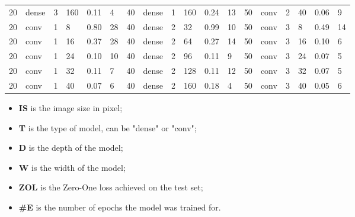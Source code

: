 \begin{table}[t!]
{\begin{tabular}{@{}llllll|llllll|llllll@{}}
20          & dense      & 3          & 160        & 0.11         & 4            & 40          & dense      & 1          & 160        & 0.24         & 13           & 50          & conv       & 2          & 40         & 0.06         & 9            \\
20          & conv       & 1          & 8          & 0.80         & 28           & 40          & dense      & 2          & 32         & 0.99         & 10           & 50          & conv       & 3          & 8          & 0.49         & 14           \\
20          & conv       & 1          & 16         & 0.37         & 28           & 40          & dense      & 2          & 64         & 0.27         & 14           & 50          & conv       & 3          & 16         & 0.10         & 6            \\
20          & conv       & 1          & 24         & 0.10         & 10           & 40          & dense      & 2          & 96         & 0.11         & 9            & 50          & conv       & 3          & 24         & 0.07         & 5            \\
20          & conv       & 1          & 32         & 0.11         & 7            & 40          & dense      & 2          & 128        & 0.11         & 12           & 50          & conv       & 3          & 32         & 0.07         & 5            \\
20          & conv       & 1          & 40         & 0.07         & 6            & 40          & dense      & 2          & 160        & 0.18         & 4            & 50          & conv       & 3          & 40         & 0.05         & 6            \\ \bottomrule
\end{tabular}}
\begin{itemize}
    \setlength\itemsep{0pt}
    \item[] \textbf{IS} is the image size in pixel;
    \item[] \textbf{T} is the type of model, can be "dense" or "conv";
    \item[] \textbf{D} is the depth of the model;
    \item[] \textbf{W} is the width of the model;
    \item[] \textbf{ZOL} is the Zero-One loss achieved on the test set;
    \item[] \textbf{\#E} is the number of epochs the model was trained for.
\end{itemize}
\end{table}
